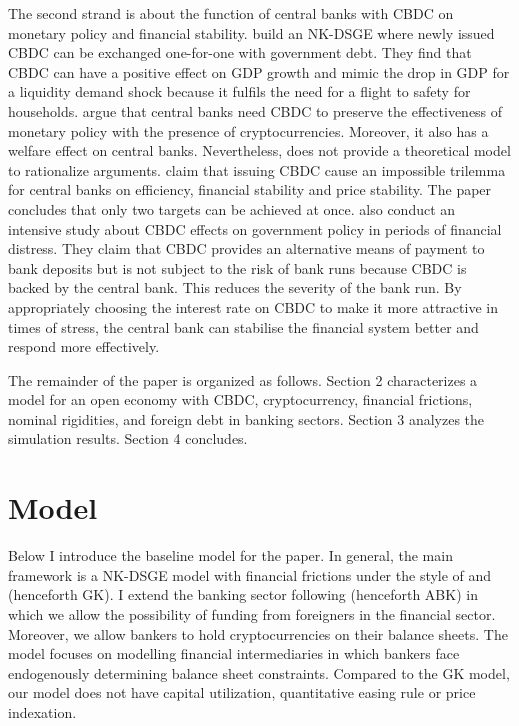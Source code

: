 \documentclass[12pt, a4paper]{article}
\begin{document}
The second strand is about the function of central banks with CBDC on monetary policy and financial stability. \cite{barrdear2016macroeconomics} build an NK-DSGE where newly issued CBDC can be exchanged one-for-one with government debt. They find that CBDC can have a positive effect on GDP growth and mimic the drop in GDP for a liquidity demand shock because it fulfils the need for a flight to safety for households. \cite{cukierman2019welfare} argue that central banks need CBDC to preserve the effectiveness of monetary policy with the presence of cryptocurrencies. Moreover, it also has a welfare effect on central banks. Nevertheless, \cite{cukierman2019welfare} does not provide a theoretical model to rationalize arguments. \cite{schilling2020central} claim that issuing CBDC cause an impossible trilemma for central banks on efficiency, financial stability and price stability. The paper concludes that only two targets can be achieved at once. \cite{keister2020discussion} also conduct an intensive study about CBDC effects on government policy in periods of financial distress. They claim that CBDC provides an alternative means of payment to bank deposits but is not subject to the risk of bank runs because CBDC is backed by the central bank. This reduces the severity of the bank run. By appropriately choosing the interest rate on CBDC to make it more attractive in times of stress, the central bank can stabilise the financial system better and respond more effectively. 

The remainder of the paper is organized as follows. Section 2 characterizes a model for an open economy with CBDC, cryptocurrency,  financial frictions, nominal rigidities, and foreign debt in banking sectors. Section 3 analyzes the simulation results. Section 4 concludes.

\section{Model}
Below I introduce the baseline model for the paper. In general, the main framework is a NK-DSGE model with financial frictions under the style of \cite{gertler2010financial} and \cite{gertler2011model} (henceforth GK). I extend the banking sector following \cite{aoki2016monetary} (henceforth ABK) in which we allow the possibility of funding from foreigners in the financial sector. Moreover, we allow bankers to hold cryptocurrencies on their balance sheets. The model focuses on modelling financial intermediaries in which bankers face endogenously determining balance sheet constraints. Compared to the GK model, our model does not have capital utilization, quantitative easing rule or price indexation. 
\end{document}
